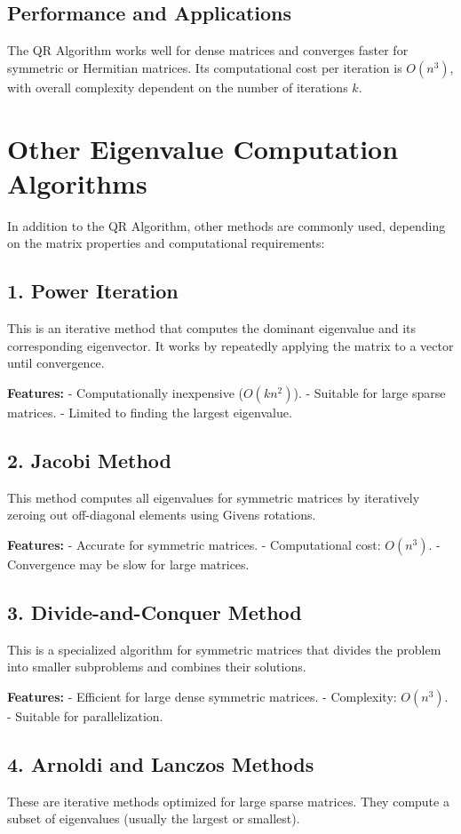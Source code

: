 \documentclass[12pt]{article}
\begin{document}
\subsection*{Performance and Applications}
The QR Algorithm works well for dense matrices and converges faster for symmetric or Hermitian matrices. Its computational cost per iteration is \( O(n^3) \), with overall complexity dependent on the number of iterations \( k \).

\section*{Other Eigenvalue Computation Algorithms}
In addition to the QR Algorithm, other methods are commonly used, depending on the matrix properties and computational requirements:

\subsection*{1. Power Iteration}
This is an iterative method that computes the dominant eigenvalue and its corresponding eigenvector. It works by repeatedly applying the matrix to a vector until convergence.

\textbf{Features:}
- Computationally inexpensive (\( O(kn^2) \)).
- Suitable for large sparse matrices.
- Limited to finding the largest eigenvalue.

\subsection*{2. Jacobi Method}
This method computes all eigenvalues for symmetric matrices by iteratively zeroing out off-diagonal elements using Givens rotations.

\textbf{Features:}
- Accurate for symmetric matrices.
- Computational cost: \( O(n^3) \).
- Convergence may be slow for large matrices.

\subsection*{3. Divide-and-Conquer Method}
This is a specialized algorithm for symmetric matrices that divides the problem into smaller subproblems and combines their solutions.

\textbf{Features:}
- Efficient for large dense symmetric matrices.
- Complexity: \( O(n^3) \).
- Suitable for parallelization.

\subsection*{4. Arnoldi and Lanczos Methods}
These are iterative methods optimized for large sparse matrices. They compute a subset of eigenvalues (usually the largest or smallest).
\end{document}
